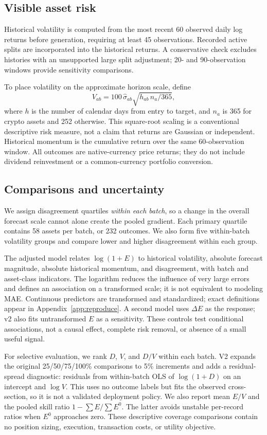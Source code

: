 \documentclass[11pt]{article}
\begin{document}
\subsection{Visible asset risk}
Historical volatility is computed from the most recent 60 observed daily log returns before generation, requiring at least 45 observations. Recorded active splits are incorporated into the historical returns. A conservative check excludes histories with an unsupported large split adjustment; 20- and 90-observation windows provide sensitivity comparisons.

To place volatility on the approximate horizon scale, define
\begin{equation}
V_{ab}=100\,\hat\sigma_{ab}\sqrt{h_{ab}\,n_a/365},
\end{equation}
where $h$ is the number of calendar days from entry to target, and $n_a$ is 365 for crypto assets and 252 otherwise. This square-root scaling is a conventional descriptive risk measure, not a claim that returns are Gaussian or independent. Historical momentum is the cumulative return over the same 60-observation window. All outcomes are native-currency price returns; they do not include dividend reinvestment or a common-currency portfolio conversion.

\subsection{Comparisons and uncertainty}
We assign disagreement quartiles \emph{within each batch}, so a change in the overall forecast scale cannot alone create the pooled gradient. Each primary quartile contains 58 assets per batch, or 232 outcomes. We also form five within-batch volatility groups and compare lower and higher disagreement within each group.

The adjusted model relates $\log(1+E)$ to historical volatility, absolute forecast magnitude, absolute historical momentum, and disagreement, with batch and asset-class indicators. The logarithm reduces the influence of very large errors and defines an association on a transformed scale; it is not equivalent to modeling MAE. Continuous predictors are transformed and standardized; exact definitions appear in Appendix~\ref{app:reproduce}. A second model uses $\Delta E$ as the response; v2 also fits untransformed $E$ as a sensitivity. These controls test conditional associations, not a causal effect, complete risk removal, or absence of a small useful signal.

For selective evaluation, we rank $D$, $V$, and $D/V$ within each batch. V2 expands the original 25/50/75/100\% comparisons to 5\% increments and adds a residual-spread diagnostic: residuals from within-batch OLS of $\log(1+D)$ on an intercept and $\log V$. This uses no outcome labels but fits the observed cross-section, so it is not a validated deployment policy. We also report mean $E/V$ and the pooled skill ratio $1-\sum E/\sum E^0$. The latter avoids unstable per-record ratios when $E^0$ approaches zero. These descriptive coverage comparisons contain no position sizing, execution, transaction costs, or utility objective.
\end{document}
